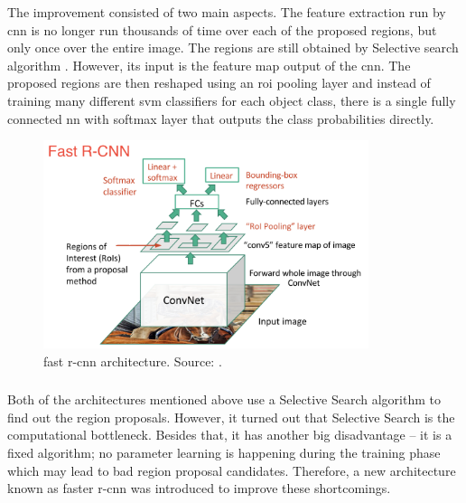             The improvement consisted of two main aspects. The feature extraction run by \gls{cnn} is no longer run thousands of time over each of the proposed regions, but only once over the entire image. The regions are still obtained by Selective search algorithm \cite{uijlings2013selective}. However, its input is the feature map output of the \gls{cnn}. The proposed regions are then reshaped using an \gls{roi} pooling layer and instead of training many different \gls{svm} \cite{cortes1995support} classifiers for each object class, there is a single fully connected \gls{nn} with softmax layer that outputs the class probabilities directly.
            
            \begin{figure}[ht]
                \centering
                \includegraphics[width=0.85\textwidth]{resources/fast_r_cnn_architecture.png}
                \caption{\Gls{fast r-cnn} architecture. Source: \cite{xuobjectdetection}.}
                \label{fig:fast r-cnn architecture}
            \end{figure}
    
        \subsubsection{}
            Both of the architectures mentioned above use a Selective Search algorithm \cite{uijlings2013selective} to find out the region proposals. However, it turned out that Selective Search is the computational bottleneck. Besides that, it has another big disadvantage -- it is a fixed algorithm; no parameter learning is happening during the training phase which may lead to bad region proposal candidates. Therefore, a new architecture known as \gls{faster r-cnn} \cite{ren2015faster} was introduced to improve these shortcomings. 
            
